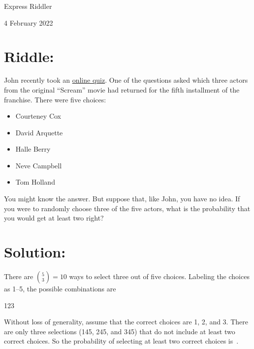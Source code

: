 \documentclass{article}
\begin{document}
\pagestyle{empty} %

\begin{center}
{\LARGE Express Riddler}

\vspace{0.15in}

{\Large 4 February 2022}
\end{center}


\section*{Riddle:}

John recently took an \href{https://www.nytimes.com/interactive/2022/01/21/briefing/news-quiz-biden-speech-microsoft-video-games.html}{online quiz}.
One of the questions asked which three actors from the original ``Scream'' movie had returned for the fifth installment of the franchise.
There were five choices:

\begin{itemize}
\item Courteney Cox
\item David Arquette
\item Halle Berry
\item Neve Campbell
\item Tom Holland
\end{itemize}

You might know the answer.
But suppose that, like John, you have no idea.
If you were to randomly choose three of the five actors, what is the probability that you would get at least two right?


\section*{Solution:}

There are $\binom{5}{3}=10$ ways to select three out of five choices.
Labeling the choices as 1--5, the possible combinations are

\vspace{0.1in}
\begin{center}
123
\end{center}
\vspace{0.1in}

Without loss of generality, assume that the correct choices are 1, 2, and 3.
There are only three selections (145, 245, and 345) that do not include at least two correct choices.
So the probability of selecting at least two correct choices is \,.
\end{document}
